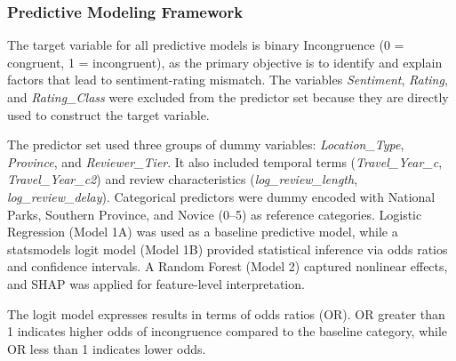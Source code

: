 \documentclass[conference]{IEEEtran}
\begin{document}
\subsubsection{Predictive Modeling Framework}
The target variable for all predictive models is binary Incongruence (0 = congruent, 1 = incongruent), as the primary objective is to identify and explain factors that lead to sentiment-rating mismatch. The variables \textit{Sentiment}, \textit{Rating}, and \textit{Rating\_Class} were excluded from the predictor set because they are directly used to construct the target variable.

The predictor set used three groups of dummy variables: \textit{Location\_Type}, \textit{Province}, and \textit{Reviewer\_Tier}. It also included temporal terms (\textit{Travel\_Year\_c}, \textit{Travel\_Year\_c2}) and review characteristics (\textit{log\_review\_length}, \textit{log\_review\_delay}). Categorical predictors were dummy encoded with National Parks, Southern Province, and Novice (0--5) as reference categories. Logistic Regression (Model 1A) was used as a baseline predictive model, while a statsmodels logit model (Model 1B) provided statistical inference via odds ratios and confidence intervals. A Random Forest (Model 2) captured nonlinear effects, and SHAP was applied for feature-level interpretation.

The logit model expresses results in terms of odds ratios (OR). OR greater than 1 indicates higher odds of incongruence compared to the baseline category, while OR less than 1 indicates lower odds.

\begin{table}[t]
\caption{Summary of Methodology}
\label{tab:summary_methodology}
\centering
{}
\end{table}
\end{document}
